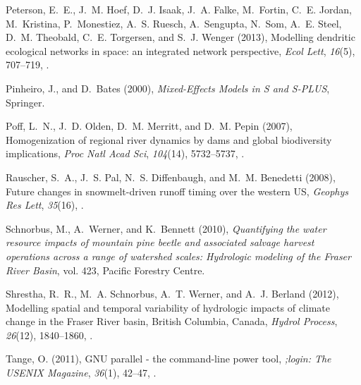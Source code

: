 \documentclass[draft,linenumbers]{AGUJournal}
\begin{document}
\begin{thebibliography}{38}
Peterson, E.~E., J.~M. Hoef, D.~J. Isaak, J.~A. Falke, M.~Fortin, C.~E. Jordan,
  M.~Kristina, P.~Monestiez, A.~S. Ruesch, A.~Sengupta, N.~Som, A.~E. Steel,
  D.~M. Theobald, C.~E. Torgersen, and S.~J. Wenger (2013), Modelling dendritic
  ecological networks in space: an integrated network perspective, \textit{Ecol
  Lett}, \textit{16}(5), 707--719, .

Pinheiro, J., and D.~Bates (2000), \textit{{Mixed-Effects} Models in S and
  {S-PLUS}}, Springer.

Poff, L.~N., J.~D. Olden, D.~M. Merritt, and D.~M. Pepin (2007), Homogenization
  of regional river dynamics by dams and global biodiversity implications,
  \textit{Proc Natl Acad Sci}, \textit{104}(14), 5732--5737,
  .

Rauscher, S.~A., J.~S. Pal, N.~S. Diffenbaugh, and M.~M. Benedetti (2008),
  Future changes in snowmelt{-}driven runoff timing over the western {US},
  \textit{Geophys Res Lett}, \textit{35}(16), .

Schnorbus, M., A.~Werner, and K.~Bennett (2010), \textit{Quantifying the water
  resource impacts of mountain pine beetle and associated salvage harvest
  operations across a range of watershed scales: Hydrologic modeling of the
  {F}raser {R}iver Basin}, vol. 423, Pacific Forestry Centre.

Shrestha, R.~R., M.~A. Schnorbus, A.~T. Werner, and A.~J. Berland (2012),
  Modelling spatial and temporal variability of hydrologic impacts of climate
  change in the {F}raser {R}iver basin, {B}ritish {C}olumbia, {C}anada, \textit{Hydrol
  Process}, \textit{26}(12), 1840--1860, .

Tange, O. (2011), {GNU} parallel - the command-line power tool, \textit{;login:
  The USENIX Magazine}, \textit{36}(1), 42--47,
  .


\end{thebibliography}
\end{document}
